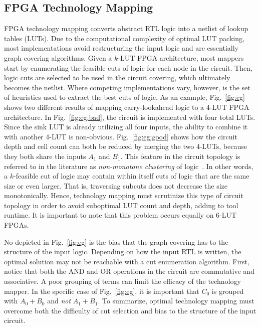 \subsection{FPGA Technology Mapping}\label{sec:background:fpga}
FPGA technology mapping converts abstract RTL logic into a netlist of lookup
tables (LUTs). Due to the computational complexity of optimal LUT packing, most
implementations avoid restructuring the input logic and are essentially graph
covering algorithms. Given a $k$-LUT FPGA architecture, most mappers start by
enumerating the feasible cuts of logic for each node in the circuit. Then,
logic cuts are selected to be used in the circuit covering, which ultimately
becomes the netlist. Where competing implementations vary, however, is the set
of heuristics used to extract the best cuts of logic. As an example,
Fig.~\ref{fig:eg} shows two different results of mapping carry-lookahead logic
to a 4-LUT FPGA architecture. In Fig.~\ref{fig:eg:bad}, the circuit is
implemented with four total LUTs. Since the sink LUT is already utilizing all
four inputs, the ability to combine it with another 4-LUT is non-obvious.
Fig.~\ref{fig:eg:good} shows how the circuit depth and cell count can both be
reduced by merging the two 4-LUTs, because they both share the inputs $A_1$ and
$B_1$. This feature in the circuit topology is referred to in the literature as
\textit{non-monotone clustering} of logic~\cite{flowmap}. In other words, a
$k$-feasible cut of logic may contain within itself cuts of logic that are the
same size or even larger. That is, traversing subcuts does not decrease the
size monotonically. Hence, technology mapping must scrutinize this type of
circuit topology in order to avoid suboptimal LUT count and depth, adding to
tool runtime. It is important to note that this problem occurs equally on 6-LUT
FPGAs.

No depicted in Fig.~\ref{fig:eg} is the bias that the graph covering has to the
structure of the input logic. Depending on how the input RTL is written, the
optimal solution may not be reachable with a cut enumeration algorithm. First,
notice that both the AND and OR operations in the circuit are commutative and
associative. A poor grouping of terms can limit the efficacy of the technology
mapper. In the specific case of Fig.~\ref{fig:eg}, it is important that $C_0$
is grouped with $A_0 + B_0$ and \textit{not} $A_1 + B_1$. To summarize, optimal
technology mapping must overcome both the difficulty of cut selection and bias
to the structure of the input circuit.

